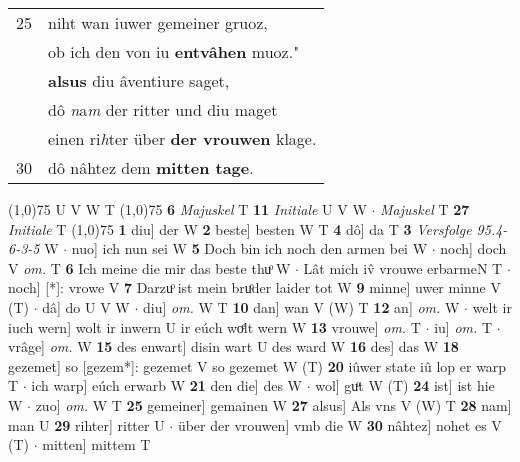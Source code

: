\documentclass[8pt,a4paper,notitlepage]{article}
\begin{document}
\begin{table}[ht]
\begin{minipage}[t]{0.5\linewidth}
\begin{tabular}{rl}
25 & niht wan iuwer gemeiner gruoz,\\ 
 & ob ich den von iu \textbf{entvâhen} muoz."\\ 
 & \textbf{alsus} diu âventiure saget,\\ 
 & dô \textit{n}a\textit{m} der ritter und diu maget\\ 
 & einen ri\textit{h}ter über \textbf{der vrouwen} klage.\\ 
30 & dô nâhtez dem \textbf{mitten tage}.\\ 
\end{tabular}
\scriptsize
\line(1,0){75} \newline
U V W T \newline
\line(1,0){75} \newline
\textbf{6} \textit{Majuskel} T  \textbf{11} \textit{Initiale} U V W   $\cdot$ \textit{Majuskel} T  \textbf{27} \textit{Initiale} T  \newline
\line(1,0){75} \newline
\textbf{1} diu] der W \textbf{2} beste] besten W T \textbf{4} dô] da T \textbf{3} \textit{Versfolge 95.4-6-3-5} W   $\cdot$ nuo] ich nun sei W \textbf{5} Doch bin ich noch den armen bei W  $\cdot$ noch] doch V \textit{om.} T \textbf{6} Ich meine die mir das beste thuͦ W  $\cdot$ Lât mich iv̂ vrouwe erbarmeN T  $\cdot$ noch] [*]: vrowe V \textbf{7} Darzuͦ ist mein bruͦder laider tot W \textbf{9} minne] uwer minne V (T)  $\cdot$ dâ] do U V W  $\cdot$ diu] \textit{om.} W T \textbf{10} dan] wan V (W) T \textbf{12} an] \textit{om.} W  $\cdot$ welt ir iuch wern] wolt ir inwern U ir eúch woͤlt wern W \textbf{13} vrouwe] \textit{om.} T  $\cdot$ iu] \textit{om.} T  $\cdot$ vrâge] \textit{om.} W \textbf{15} des enwart] disin wart U des ward W \textbf{16} des] das W \textbf{18} gezemet] so [gezem*]: gezemet V so gezemet W (T) \textbf{20} iûwer state iû lop er warp T  $\cdot$ ich warp] eúch erwarb W \textbf{21} den die] des W  $\cdot$ wol] guͦt W (T) \textbf{24} ist] ist hie W  $\cdot$ zuo] \textit{om.} W T \textbf{25} gemeiner] gemainen W \textbf{27} alsus] Als vns V (W) T \textbf{28} nam] man U \textbf{29} rihter] ritter U  $\cdot$ über der vrouwen] vmb die W \textbf{30} nâhtez] nohet es V (T)  $\cdot$ mitten] mittem T \newline
\end{minipage}
\end{table}
\end{document}
